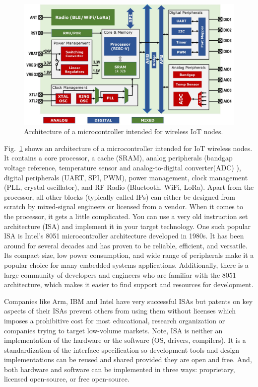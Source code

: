 \documentclass[journal]{IEEEtran}
\begin{document}
\begin{figure}[htb]
    \centering
    \includegraphics[width=0.95\linewidth]{image-uC.jpg}
    \caption{Architecture of a microcontroller intended for wireless IoT nodes.}
    \label{fig:uC}
\end{figure}

Fig.~\ref{fig:uC} shows an architecture of a microcontroller intended for IoT wireless nodes. It contains a core processor, a cache (SRAM), analog peripherals (bandgap voltage reference, temperature sensor and analog-to-digital converter(ADC) ), digital peripherals (UART, SPI, PWM), power management, clock management (PLL, crystal oscillator), and RF Radio (Bluetooth, WiFi, LoRa). Apart from the processor, all other blocks (typically called IPs) can either be designed from scratch by mixed-signal engineers or licensed from a vendor. When it comes to the processor, it gets a little complicated. You can use a very old instruction set architecture (ISA) and implement it in your target technology. One such popular ISA is Intel's 8051 microcontroller architecture developed in 1980s. It has been around for several decades and has proven to be reliable, efficient, and versatile. Its compact size, low power consumption, and wide range of peripherals make it a popular choice for many embedded systems applications. Additionally, there is a large community of developers and engineers who are familiar with the 8051 architecture, which makes it easier to find support and resources for development.

Companies like Arm, IBM and Intel have very successful ISAs but patents on key aspects of their ISAs prevent others from using them without licenses which imposes a prohibitive cost for most educational, research organization or companies trying to target low-volume markets. 
Note, ISA is neither an implementation of the hardware or the software (OS, drivers, compilers). It is a standardization of the interface specification so development tools and design implementations can be reused and shared provided they are open and free. And, both hardware and software can be implemented in three ways: proprietary, licensed open-source, or free open-source.
\end{document}
